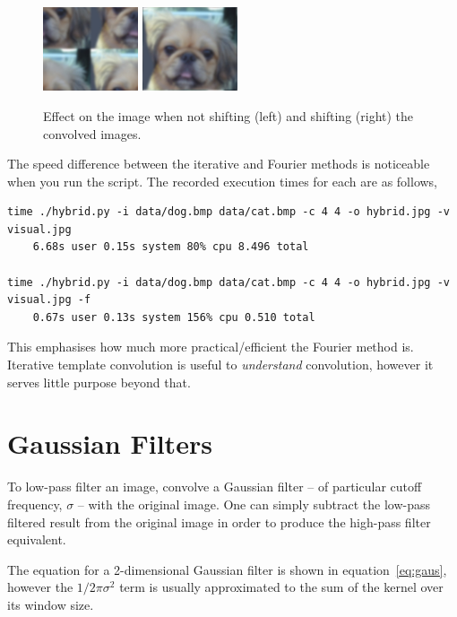\documentclass[a4paper]{article}
\begin{document}
\begin{figure}[!htbp]
    \centering
    \includegraphics[width=0.25\textwidth]{../no_shift}
    \includegraphics[width=0.25\textwidth]{../low}    
    \caption{Effect on the image when not shifting (left) and shifting (right) the convolved images.}
    \label{fig:no-shift}
\end{figure}

The speed difference between the iterative and Fourier methods is noticeable when you run the script. The recorded execution times for each are as follows,

\begin{verbatim}
time ./hybrid.py -i data/dog.bmp data/cat.bmp -c 4 4 -o hybrid.jpg -v visual.jpg  
    6.68s user 0.15s system 80% cpu 8.496 total
    
time ./hybrid.py -i data/dog.bmp data/cat.bmp -c 4 4 -o hybrid.jpg -v visual.jpg -f 
    0.67s user 0.13s system 156% cpu 0.510 total
\end{verbatim}

This emphasises how much more practical/efficient the Fourier method is. Iterative template convolution is useful to \textit{understand} convolution, however it serves little purpose beyond that.

\section{Gaussian Filters}
To low-pass filter an image, convolve a Gaussian filter -- of particular cutoff frequency, $\sigma$ -- with the original image. One can simply subtract the low-pass filtered result from the original image in order to produce the high-pass filter equivalent. 

The equation for a 2-dimensional Gaussian filter is shown in equation~\ref{eq:gaus}, however the $1/2\pi\sigma^2$ term is usually approximated to the sum of the kernel over its window size.
\end{document}
